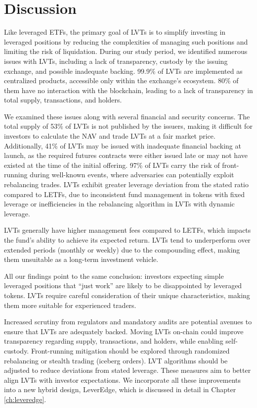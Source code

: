 \section{Discussion}
Like leveraged ETFs, the primary goal of LVTs is to simplify investing in leveraged positions by reducing the complexities of managing such positions and limiting the risk of liquidation. During our study period, we identified numerous issues with LVTs, including a lack of transparency, custody by the issuing exchange, and possible inadequate backing. 99.9\% of LVTs are implemented as centralized products, accessible only within the exchange's ecosystem. 80\% of them have no interaction with the blockchain, leading to a lack of transparency in total supply, transactions, and holders. 

We examined these issues along with several financial and security concerns. The total supply of 53\% of LVTs is not published by the issuers, making it difficult for investors to calculate the NAV and trade LVTs at a fair market price. Additionally, 41\% of LVTs may be issued with inadequate financial backing at launch, as the required futures contracts were either issued late or may not have existed at the time of the initial offering. 97\% of LVTs carry the risk of front-running during well-known events, where adversaries can potentially exploit rebalancing trades. LVTs exhibit greater leverage deviation from the stated ratio compared to LETFs, due to inconsistent fund management in tokens with fixed leverage or inefficiencies in the rebalancing algorithm in LVTs with dynamic leverage. 

LVTs generally have higher management fees compared to LETFs, which impacts the fund's ability to achieve its expected return. LVTs tend to underperform over extended periods (monthly or weekly) due to the compounding effect, making them unsuitable as a long-term investment vehicle.

All our findings point to the same conclusion: investors expecting simple leveraged positions that ``just work'' are likely to be disappointed by leveraged tokens. LVTs require careful consideration of their unique characteristics, making them more suitable for experienced traders. 

Increased scrutiny from regulators and mandatory audits are potential avenues to ensure that LVTs are adequately backed. Moving LVTs on-chain could improve transparency regarding supply, transactions, and holders, while enabling self-custody. Front-running mitigation should be explored through randomized rebalancing or stealth trading (\eg iceberg orders). LVT algorithms should be adjusted to reduce deviations from stated leverage. These measures aim to better align LVTs with investor expectations. We incorporate all these improvements into a new hybrid design, LeverEdge, which is discussed in detail in Chapter \ref{ch:leveredge}.
